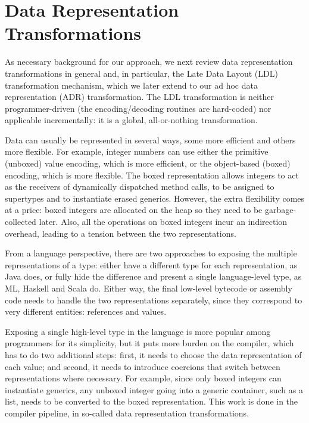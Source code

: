 \section{Data Representation Transformations}
\label{sec:drt}

As necessary background for our approach, we next review data
representation transformations in general and, in particular, the Late
Data Layout (LDL) transformation mechanism, which we later extend to
our ad hoc data representation (ADR) transformation. The LDL
transformation is neither programmer-driven (the encoding/decoding
routines are hard-coded) nor applicable incrementally: it is a global,
all-or-nothing transformation.


Data can usually be represented in several ways, some more efficient and others more flexible. For example, integer numbers can use either the primitive (unboxed) value encoding, which is more efficient, or the object-based (boxed) encoding, which is more flexible. The boxed representation allows integers to act as the receivers of dynamically dispatched method calls, to be assigned to supertypes and to instantiate erased generics. However, the extra flexibility comes at a price: boxed integers are allocated on the heap so they need to be garbage-collected later. Also, all the operations on boxed integers incur an indirection overhead, leading to a tension between the two representations.

From a language perspective, there are two approaches to exposing the multiple representations of a type: either have a different
type for each representation, as Java does, or fully hide the difference and present a single language-level type, as ML, Haskell and Scala do. Either way, the final low-level bytecode or assembly code needs to handle the two representations separately, since they correspond to very different entities: references and values.

Exposing a single high-level type in the language is more popular among programmers for its simplicity, but it puts more burden on the compiler, which has to do two additional steps: first, it needs to choose the data representation of each value; and second, it needs to introduce coercions that switch between representations where necessary. For example, since only boxed integers can instantiate generics, any unboxed integer going into a generic container, such as a list, needs to be converted to the boxed representation. This work is done in the compiler pipeline, in so-called data representation transformations.

